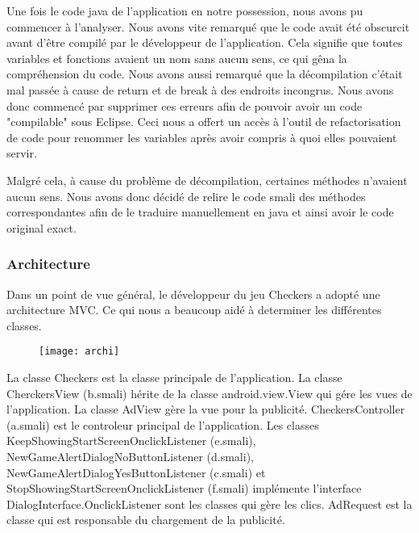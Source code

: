Une fois le code java de l'application en notre possession, nous avons pu commencer à l'analyser.
Nous avons vite remarqué que le code avait été obscurcit avant d'être compilé par le développeur de l'application.
Cela signifie que toutes variables et fonctions avaient un nom sans aucun sens, ce qui gêna la compréhension du code.
Nous avons aussi remarqué que la décompilation c'était mal passée à cause de return et de break à des endroits incongrus.
Nous avons donc commencé par supprimer ces erreurs afin de pouvoir avoir un code "compilable" sous Eclipse.
Ceci nous a offert un accès à l'outil de refactorisation de code pour renommer les variables après avoir compris à quoi elles pouvaient servir.

Malgré cela, à cause du problème de décompilation, certaines méthodes n'avaient aucun sens.
Nous avons donc décidé de relire le code smali des méthodes correspondantes afin de le traduire manuellement en java et ainsi avoir le code original exact.

\subsubsection{Architecture}
Dans un point de vue général, le développeur du jeu Checkers a adopté une architecture MVC. Ce qui nous a beaucoup aidé à determiner les différentes 
classes. 
\begin{figure}[hp]
	      \begin{center}
		\texttt{[image: archi]}
	      \end{center}
\end{figure}
La classe Checkers est la classe principale de l’application.
La classe CherckersView (b.smali) hérite de la classe android.view.View qui gére les vues de l’application. La classe AdView gère la vue pour la publicité.
CheckersController (a.smali) est le controleur principal de l’application. Les classes KeepShowingStartScreenOnclickListener (e.smali), NewGameAlertDialogNoButtonListener (d.smali), NewGameAlertDialogYesButtonListener (c.smali) et StopShowingStartScreenOnclickListener (f.smali) implémente l'interface DialogInterface.OnclickListener sont les classes qui gère les clics.
AdRequest est la classe qui est responsable du chargement de la publicité.
